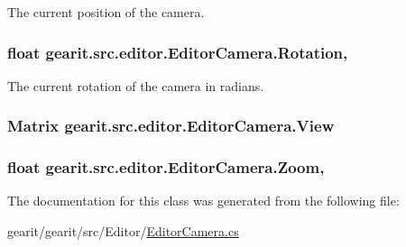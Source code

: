 The current position of the camera. 

\hypertarget{classgearit_1_1src_1_1editor_1_1_editor_camera_a215303d1d3853e0e9f154474e7345804}{
\subsubsection[{Rotation}]{\setlength{\rightskip}{0pt plus 5cm}float gearit.\+src.\+editor.\+Editor\+Camera.\+Rotation\hspace{0.3cm}{\ttfamily [get]}, {\ttfamily [set]}}}\label{classgearit_1_1src_1_1editor_1_1_editor_camera_a215303d1d3853e0e9f154474e7345804}


The current rotation of the camera in radians. 

\hypertarget{classgearit_1_1src_1_1editor_1_1_editor_camera_aa6707ae235d5de27a6124371892da70e}{
\subsubsection[{View}]{\setlength{\rightskip}{0pt plus 5cm}Matrix gearit.\+src.\+editor.\+Editor\+Camera.\+View\hspace{0.3cm}{\ttfamily [get]}}}\label{classgearit_1_1src_1_1editor_1_1_editor_camera_aa6707ae235d5de27a6124371892da70e}
\hypertarget{classgearit_1_1src_1_1editor_1_1_editor_camera_a1bff1180b0422813073c351e6ab4d68a}{
\subsubsection[{Zoom}]{\setlength{\rightskip}{0pt plus 5cm}float gearit.\+src.\+editor.\+Editor\+Camera.\+Zoom\hspace{0.3cm}{\ttfamily [get]}, {\ttfamily [set]}}}\label{classgearit_1_1src_1_1editor_1_1_editor_camera_a1bff1180b0422813073c351e6ab4d68a}


The documentation for this class was generated from the following file\+:\begin{DoxyCompactItemize}
\item 
gearit/gearit/src/\+Editor/\hyperlink{_editor_camera_8cs}{Editor\+Camera.\+cs}\end{DoxyCompactItemize}

